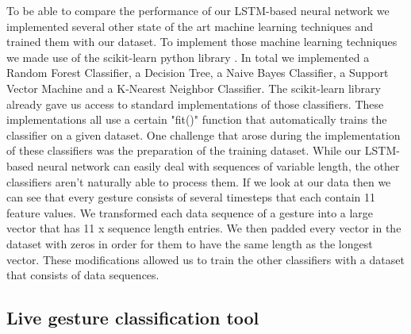 \documentclass[runningheads]{llncs}
\begin{document}
To be able to compare the performance of our LSTM-based neural network we implemented several other state of the art machine learning techniques and trained them with our dataset. To implement those machine learning techniques we made use of the scikit-learn python library \cite{scikit-learn}. In total we implemented a Random Forest Classifier, a Decision Tree, a Naive Bayes Classifier, a Support Vector Machine and a K-Nearest Neighbor Classifier. The scikit-learn library already gave us access to standard implementations of those classifiers. These implementations all use a certain "fit()" function that automatically trains the classifier on a given dataset. One challenge that arose during the implementation of these classifiers was the preparation of the training dataset. While our LSTM-based neural network can easily deal with sequences of variable length, the other classifiers aren't naturally able to process them. If we look at our data then we can see that every gesture consists of several timesteps that each contain 11 feature values. We transformed each data sequence of a gesture into a large vector that has 11 x sequence length entries. We then padded every vector in the dataset with zeros in order for them to have the same length as the longest vector. These modifications allowed us to train the other classifiers with a dataset that consists of data sequences.

\subsection{Live gesture classification tool}
\end{document}
